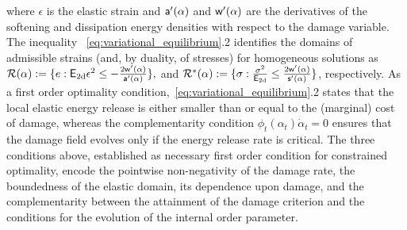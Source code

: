where $\epsilon$ is the elastic strain and $\mathsf{a}'(\alpha)$ and $\mathsf{w}'(\alpha)$ are the derivatives of the softening and dissipation energy densities with respect to the damage variable.
The inequality ~\eqref{eq:variational_equilibrium}.2 identifies the domains of admissible strains (and, by duality, of stresses) for homogeneous solutions as
$\mathcal{R}(\alpha):=\{e: \mathsf{E_{\text{2d}}} \epsilon^2 \leq -\frac{2 \mathsf{w}'(\alpha)}{\mathsf{a}'(\alpha)}\},$ and $
\mathcal{R}^*(\alpha):=\{\sigma: \frac{\sigma^2}{\mathsf{E_{\text{2d}}}} \leq \frac{2 \mathsf{w}'(\alpha)}{\mathsf{s}'(\alpha)}\}$, respectively.
% 
As a first order optimality condition,~\eqref{eq:variational_equilibrium}.2 states that the local elastic energy release is either smaller than or equal to the (marginal) cost of damage, whereas the complementarity condition $\phi_t(\alpha_t)\dot \alpha_t = 0$ ensures that the damage field evolves only if the energy release rate is critical.
The three conditions above, established as necessary first order condition for constrained optimality, encode the pointwise non-negativity of the damage rate, the boundedness of the elastic domain, its dependence upon damage, and the complementarity between the attainment of the damage criterion and the conditions for the evolution of the internal order parameter. 

